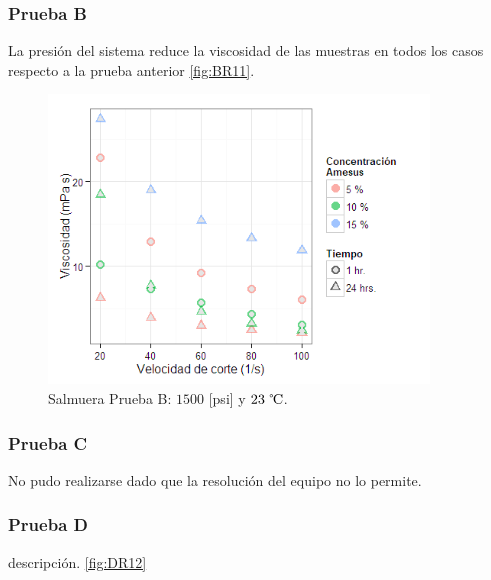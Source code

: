     \subsubsection{Prueba B}
    La presión del sistema reduce la viscosidad de las muestras en todos los casos respecto a la prueba anterior \autoref{fig:BR11}.
    
    \begin{figure}[h]
        \centering
        \includegraphics[width=0.9\textwidth]{R_plot/Rplot11.png}
        \caption[Prueba B salmuera]{Salmuera Prueba B: $1500$ [psi] y $23~\celsius$.}
        \label{fig:BR11}
    \end{figure}
    
    \subsubsection{Prueba C} 
    No pudo realizarse dado que la resolución del equipo no lo permite.
    
    \subsubsection{Prueba D}
    descripción. \autoref{fig:DR12}
    
